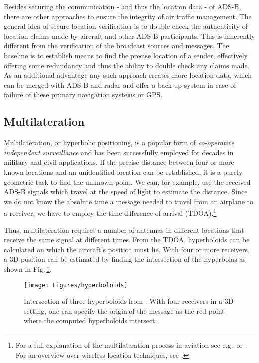 \documentclass[english]{IEEEtran}
\begin{document}
Besides securing the communication - and thus the location data -
of ADS-B, there are other approaches to ensure the integrity of air
traffic management. The general idea of secure location verification
is to double check the authenticity of location claims made by aircraft
and other ADS-B participants. This is inherently different from the
verification of the broadcast sources and messages. The baseline is
to establish means to find the precise location of a sender, effectively
offering some redundancy and thus the ability to double check any
claims made. As an additional advantage any such approach creates
more location data, which can be merged with ADS-B and radar and offer
a back-up system in case of failure of these primary navigation systems
or GPS. 


\subsection{Multilateration\label{sub:Multilateration}}

Multilateration, or hyperbolic positioning, is a popular form of \emph{co-operative
independent surveillance} and has been successfully employed for decades
in military and civil applications. If the precise distance between
four or more known locations and an unidentified location can be established,
it is a purely geometric task to find the unknown point. We can, for
example, use the received ADS-B signals which travel at the speed
of light to estimate the distance. Since we do not know the absolute
time a message needed to travel from an airplane to a receiver, we
have to employ the time difference of arrival (TDOA).\footnote{For a full explanation of the multilateration process in aviation
see e.g.\,\cite{Savvides2002} or \cite{Neven2005}. For an overview
over wireless location techniques, see \cite{sayed2005network}.}\emph{ }

Thus, multilateration requires a number of antennas\emph{ }in different
locations that receive the same signal at different times. From the
TDOA, hyperboloids can be calculated on which the aircraft's position
must lie.\emph{ }With four or more receivers, a 3D position can be
estimated by finding the intersection of the hyperbolas as shown in
Fig.\,\ref{fig:Intersection-of-three}.
\begin{figure}
\texttt{[image: Figures/hyperboloids]}

\caption{Intersection of three hyperboloids from \cite{Xu2010}. With four
receivers in a 3D setting, one can specify the origin of the message
as the red point where the computed hyperboloids intersect. \label{fig:Intersection-of-three}}


\end{figure}
\end{document}
